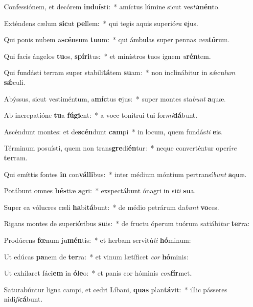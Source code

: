 \item Confessiónem, et decórem \textbf{ind}u\textbf{ís}ti:~* amíctus lúmine sicut ves\textit{ti}\textbf{mén}to.
\item Exténdens cælum \textbf{sic}ut \textbf{pel}lem:~* qui tegis aquis superió\textit{ra} \textbf{e}jus.
\item Qui ponis nubem a\textbf{scén}sum \textbf{tu}um:~* qui ámbulas super pennas \textit{ven}\textbf{tó}rum.
\item Qui facis ángelos \textbf{tu}os, \textbf{spí}\textbf{ri}tus:~* et minístros tuos ignem \textit{u}\textbf{rén}tem.
\item Qui fundásti terram super stabili\textbf{tá}tem \textbf{su}am:~* non inclinábitur in sǽcu\textit{lum} \textbf{sǽ}culi.
\item Abýssus, sicut vestiméntum, a\textbf{míc}tus \textbf{e}jus:~* super montes sta\textit{bunt} \textbf{a}quæ.
\item Ab increpatióne \textbf{tu}a \textbf{fú}\textbf{gi}ent:~* a voce tonítrui tui for\textit{mi}\textbf{dá}bunt.
\item Ascéndunt montes: et de\textbf{scén}dunt \textbf{cam}pi~* in locum, quem fundás\textit{ti} \textbf{e}is.
\item Términum posuísti, quem non trans\textbf{gre}di\textbf{én}tur:~* neque converténtur operí\textit{re} \textbf{ter}ram.
\item Qui emíttis fontes \textbf{in} con\textbf{vál}\textbf{li}bus:~* inter médium móntium pertransí\textit{bunt} \textbf{a}quæ.
\item Potábunt omnes \textbf{bés}tiæ \textbf{a}gri:~* exspectábunt ónagri in si\textit{ti} \textbf{su}a.
\item Super ea vólucres cæli \textbf{ha}bi\textbf{tá}bunt:~* de médio petrárum da\textit{bunt} \textbf{vo}ces.
\item Rigans montes de superi\textbf{ó}ribus \textbf{su}is:~* de fructu óperum tuórum satiábi\textit{tur} \textbf{ter}ra:
\item Prodúcens \textbf{fœ}num ju\textbf{mén}tis:~* et herbam servitú\textit{ti} \textbf{hó}minum:
\item Ut edúcas \textbf{pa}nem de \textbf{ter}ra:~* et vinum lætíficet \textit{cor} \textbf{hó}minis:
\item Ut exhílaret fáci\textbf{em} in \textbf{ó}\textbf{le}o:~* et panis cor hóminis \textit{con}\textbf{fír}met.
\item Saturabúntur ligna campi, et cedri Líbani, \textbf{quas} plan\textbf{tá}vit:~* illic pásseres nidi\textit{fi}\textbf{cá}bunt.
